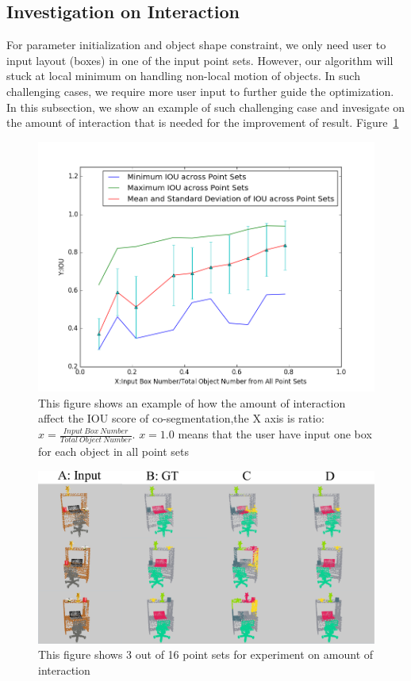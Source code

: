 \subsection{Investigation on Interaction}
\label{subsec:interact}
For parameter initialization and object shape constraint, we only need user to input layout (boxes) in one of the input point sets. However, our algorithm will stuck at local minimum on handling non-local motion of objects. In such challenging cases, we require more user input to further guide the optimization. In this subsection, we show an example of such challenging case and invesigate on the amount of interaction that is needed for the improvement of result. Figure~\ref{fig:interact_number}
\begin{figure}
	\centering
	\includegraphics[width=\linewidth]{images/interact/IOU.png}
	\caption{This figure shows an example of how the amount of interaction affect the IOU score of co-segmentation,the X axis is ratio: $x=\frac{Input~Box~Number}{Total~Object~Number}$. $x=1.0$ means that the user have input one box for each object in all point sets}
	\label{fig:interact_number}
\end{figure}

\begin{figure}
	\centering
	\includegraphics[width=\linewidth]{images/interact/interact}
	\caption{This figure shows 3 out of 16 point sets  for experiment on amount of interaction}
	\label{fig:interact_vis}
\end{figure}

